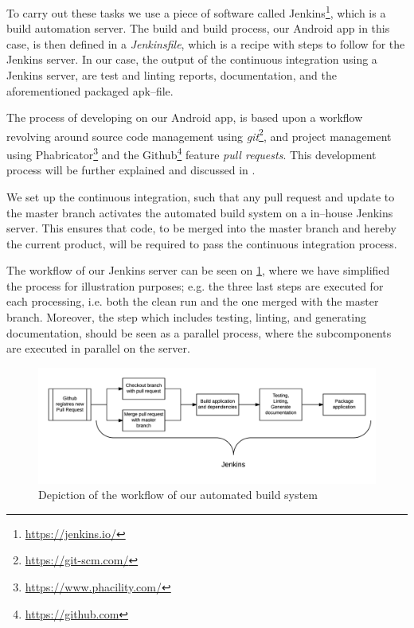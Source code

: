 To carry out these tasks we use a piece of software called Jenkins\footnote{\url{https://jenkins.io/}}, which is a build automation server.
The build and build process, our Android app in this case, is then defined in a \textit{Jenkinsfile}, which is a recipe with steps to follow for the Jenkins server.
In our case, the output of the continuous integration using a Jenkins server, are test and linting reports, documentation, and the aforementioned packaged apk--file.

The process of developing on our Android app, is based upon a workflow revolving around source code management using \textit{git}\footnote{\url{https://git-scm.com/}}, and project management using Phabricator\footnote{\url{https://www.phacility.com/}} and the Github\footnote{\url{https://github.com}} feature \textit{pull requests}.
This development process will be further explained and discussed in .

We set up the continuous integration, such that any pull request and update to the master branch activates the automated build system on a in--house Jenkins server.
This ensures that code, to be merged into the master branch and hereby the current product, will be required to pass the continuous integration process.

The workflow of our Jenkins server can be seen on \cref{fig:jenkins_workflow}, where we have simplified the process for illustration purposes; e.g. the three last steps are executed for each processing, i.e. both the clean run and the one merged with the master branch.
Moreover, the step which includes testing, linting, and generating documentation, should be seen as a parallel process, where the subcomponents are executed in parallel on the server.

\begin{figure}[tb]
    \includegraphics[width=1\textwidth]{./jenkins_workflow.png}
    \caption{Depiction of the workflow of our automated build system}\label{fig:jenkins_workflow}
\end{figure}

